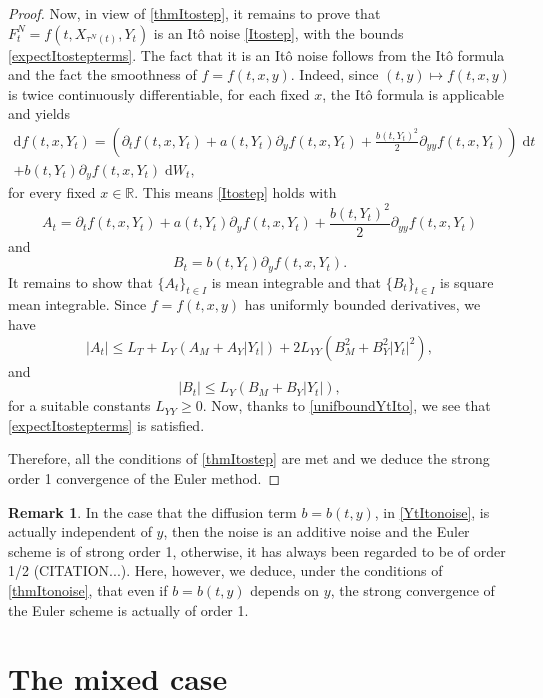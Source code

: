 \documentclass[reqno,12pt]{amsart}
\theoremstyle{plain}%
\theoremstyle{definition}
\newtheorem{rmk}{Remark}[section]
\begin{document}
\begin{proof}
    Now, in view of \cref{thmItostep}, it remains to prove that $F_t^N = f(t, X_{\tau^N(t)}, Y_t)$ is an It\^o noise  \eqref{Itostep}, with the bounds \eqref{expectItostepterms}. The fact that it is an It\^o noise follows from the It\^o formula and the fact the smoothness of $f=f(t, x, y)$. Indeed, since $(t, y) \mapsto f(t, x, y)$ is twice continuously differentiable, for each fixed $x$, the It\^o formula is applicable and yields
    \begin{multline}
        \label{itoformula}
            \mathrm{d}f(t, x, Y_t) = \left(\partial_t f(t, x, Y_t) + a(t, Y_t) \partial_y f(t, x, Y_t)  + \frac{b(t, Y_t)^2}{2}\partial_{yy}f(t, x, Y_t) \right) \;\mathrm{d}t \\ + b(t, Y_t) \partial_y f(t, x, Y_t)\;\mathrm{d}W_t,
        \end{multline}
    for every fixed $x\in \mathbb{R}$. This means \eqref{Itostep} holds with
    \[
        A_t = \partial_t f(t, x, Y_t) + a(t, Y_t) \partial_y f(t, x, Y_t)  + \frac{b(t, Y_t)^2}{2}\partial_{yy}f(t, x, Y_t)
    \]
    and
    \[
        B_t = b(t, Y_t) \partial_y f(t, x, Y_t).
    \]
    It remains to show that $\{A_t\}_{t\in I}$ is mean integrable and that $\{B_t\}_{t\in I}$ is square mean integrable. Since $f=f(t, x, y)$ has uniformly bounded derivatives, we have
    \[
        |A_t| \leq L_T + L_Y(A_M + A_Y|Y_t|) + 2L_{YY}(B_M^2 + B_Y^2|Y_t|^2),
    \]
    and
    \[
        |B_t| \leq L_Y (B_M + B_Y |Y_t|),
    \]
    for a suitable constants $L_{YY}\geq 0$. Now, thanks to \eqref{unifboundYtIto}, we see that \eqref{expectItostepterms} is satisfied.

    Therefore, all the conditions of \cref{thmItostep} are met and we deduce the strong order 1 convergence of the Euler method.
\end{proof}

\begin{rmk}
    In the case that the diffusion term $b = b(t, y)$, in \eqref{YtItonoise}, is actually independent of $y$, then the noise is an additive noise and the Euler scheme is of strong order 1, otherwise, it has always been regarded to be of order 1/2 (CITATION...). Here, however, we deduce, under the conditions of \cref{thmItonoise}, that even if $b=b(t, y)$ depends on $y$, the strong convergence of the Euler scheme is actually of order 1.    
\end{rmk}

\section{The mixed case}
\label{secmixed}
\end{document}
